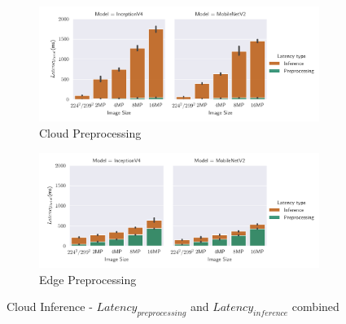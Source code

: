 \begin{figure}[H]
\centering
\begin{subfigure}[b]{0.95\textwidth}
   \includegraphics[width=1\linewidth]{./Bilder/single_plots/cloud_inference_plots/Cloud_Preprocessing_Inference_Comb_cloud_prepro.pdf}
   \caption{Cloud Preprocessing}
   \label{fig:CloudInference+PreproCloud} 
\end{subfigure}

\begin{subfigure}[b]{0.95\textwidth}
   \includegraphics[width=1\linewidth]{./Bilder/single_plots/cloud_inference_plots/Cloud_Preprocessing_Inference_Comb_edge_prepro.pdf}
   \caption{Edge Preprocessing}
   \label{fig:CloudInference+PreproEdge}
\end{subfigure}

\caption{Cloud Inference -  $Latency_{preprocessing}$ and $Latency_{inference}$ combined}
\end{figure}

